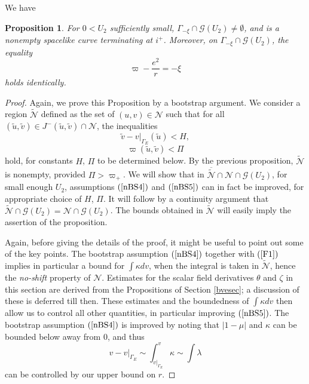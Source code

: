 \documentclass{article}
\newtheorem{proposition}[theorem]{Proposition}
\begin{document}
{We have
\begin{proposition}
\label{deutprotasn}
For $0<U_2$ sufficiently small,
$\Gamma_{-\xi}\cap\mathcal{G}(U_2)\ne\emptyset$, and
is a nonempty spacelike curve terminating at $i^+$. 
Moreover, on $\Gamma_{-\xi}\cap\mathcal{G}(U_2)$,
the equality
\[
\varpi-\frac{e^2}r=-\xi
\]
holds
identically.
\end{proposition}


\begin{proof}
Again, we prove this Proposition by a bootstrap argument.
We consider a region $\tilde{\mathcal{N}}$ defined as
the set of 
$(u,v)\in \mathcal{N}$ such that for all $(\tilde{u},\tilde{v})
\in J^-(\tilde{u},\tilde{v})\cap \mathcal{N}$,
the inequalities
\begin{equation}
\label{nBS4}
\tilde{v}-v|_{\Gamma_E}(\tilde{u})< H,
\end{equation}
\begin{equation}
\label{nBS5}
\varpi(\tilde{u},\tilde{v})<\Pi
\end{equation}
hold, for constants $H$, $\Pi$ to be determined below.
By the previous proposition, $\tilde{\mathcal{N}}$ is nonempty, 
provided $\Pi>\varpi_+$.
We will show that in $\overline{\tilde{\mathcal{N}}}\cap \mathcal{N}
\cap\mathcal{G}(U_2)$,
for small enough $U_2$, assumptions
$(\ref{nBS4})$ and $(\ref{nBS5})$ can in fact
be improved, for appropriate choice of $H$, $\Pi$.
It will follow
by a continuity argument that 
$\tilde{\mathcal{N}}\cap\mathcal{G}(U_2)=\mathcal{N}\cap\mathcal{G}(U_2)$.
The bounds obtained in $\tilde{\mathcal{N}}$ will easily imply the
assertion of the proposition.


Again, before giving the details of the proof,  it might
be useful to point out some of the key points. 
The bootstrap
assumption $(\ref{nBS4})$ together with $(\ref{F1})$
implies in particular
a bound for $\int\kappa dv$, when the integral is taken in $\tilde{\mathcal{N}}$,
hence the \emph{no-shift} property of $\mathcal{N}$.
Estimates for the scalar field derivatives $\theta$ and
$\zeta$ in this section are derived from
the Propositions of Section \ref{bvesec}; a discussion of these
is deferred till then. These estimates and
the boundedness of $\int\kappa dv$ then allow us
to control all other quantities, in particular
improving $(\ref{nBS5})$. The bootstrap assumption $(\ref{nBS4})$
is improved by noting that $|1-\mu|$ and $\kappa$
can be bounded below away from $0$, and thus 
\[
v-v|_{\Gamma_E}\sim\int_{v|_{\Gamma_E}}^v
{\kappa}\sim\int\lambda
\]
can be controlled by our upper bound on $r$.


\end{proof}}
\end{document}
